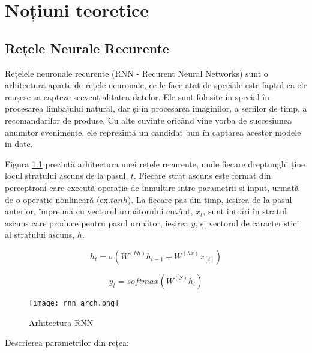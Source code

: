 \chapter{Noțiuni teoretice}

\section{Rețele Neurale Recurente}

Rețelele neuronale recurente (RNN - Recurent Neural Networks) sunt o arhitectura aparte de rețele neuronale, ce le face atat de speciale este faptul ca ele reușesc sa capteze secvențialitatea datelor. Ele sunt folosite in special în procesarea limbajului natural, dar și în procesarea imaginilor, a seriilor de timp, a recomandarilor de produse. Cu alte cuvinte oricând vine vorba de succesiunea anumitor evenimente, ele reprezintă un candidat bun în captarea acestor modele in date.

Figura \ref{fig:rnn_arch} prezintă arhitectura unei rețele recurente, unde fiecare dreptunghi ține locul stratului ascuns de la pasul, $t$. Fiecare strat ascuns este format din perceptroni care execută operația de înmulțire intre parametrii și input, urmată de o operație nonlineară (ex.$ tanh$). La fiecare pas din timp, ieșirea de la pasul anterior, împreună cu vectorul următorului cuvânt, $x_t$, sunt intrări în stratul ascuns care produce pentru pasul următor, ieșirea $y$, și vectorul de caracteristici al stratului ascuns, $h$.


\begin{equation}
	h_t = \sigma{(W^{(hh)} h_{t-1} + W^{(hx)} x_{[t]})}
	\label{h_t}
\end{equation}

\begin{equation}
	y_t = softmax(W^{(S)} h_t) 
	\label{y_t}
\end{equation}

\begin{figure}[h]
	\centering
	\texttt{[image: rnn\_arch.png]}
	\caption{Arhitectura RNN \cite{cs224d_notes}}
	\label{fig:rnn_arch}
\end{figure}

Descrierea parametrilor din rețea:

